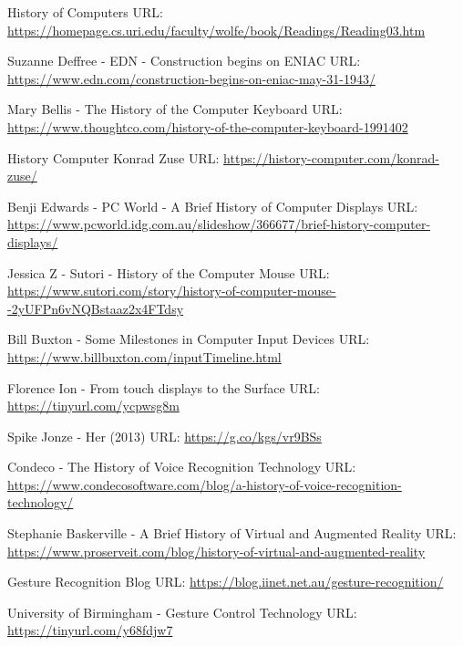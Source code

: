 \documentclass{article}
\begin{document}
 \newpage
 \begin{thebibliography}{00}
    
 History of Computers
\newline
URL: \url{https://homepage.cs.uri.edu/faculty/wolfe/book/Readings/Reading03.htm}

 Suzanne Deffree - EDN - Construction begins on ENIAC
\newline
URL: \url{https://www.edn.com/construction-begins-on-eniac-may-31-1943/}

 Mary Bellis - The History of the Computer Keyboard
\newline
URL: \url{https://www.thoughtco.com/history-of-the-computer-keyboard-1991402}

 History Computer Konrad Zuse
\newline
URL: \url{https://history-computer.com/konrad-zuse/}

 Benji Edwards - PC World - A Brief History of Computer Displays
\newline
URL: \url{https://www.pcworld.idg.com.au/slideshow/366677/brief-history-computer-displays/}

 Jessica Z - Sutori - History of the Computer Mouse
\newline
URL: \url{https://www.sutori.com/story/history-of-computer-mouse--2yUFPn6vNQBstaaz2x4FTdsy}

 Bill Buxton - Some Milestones in Computer Input Devices
\newline
URL: \url{https://www.billbuxton.com/inputTimeline.html}

 Florence Ion - From touch displays to the Surface
\newline
URL: \url{https://tinyurl.com/ycpwsg8m}

 Spike Jonze - Her (2013)
\newline
URL: \url{https://g.co/kgs/vr9BSs}

 Condeco - The History of Voice Recognition Technology
\newline
URL: \url{https://www.condecosoftware.com/blog/a-history-of-voice-recognition-technology/}

  Stephanie Baskerville - A Brief History of Virtual and Augmented Reality
\newline
URL: \url{https://www.proserveit.com/blog/history-of-virtual-and-augmented-reality}

 Gesture Recognition Blog
\newline
URL: \url{https://blog.iinet.net.au/gesture-recognition/}

 University of Birmingham - Gesture Control Technology
\newline
URL: \url{https://tinyurl.com/y68fdjw7}


\end{thebibliography}

\end{document}
